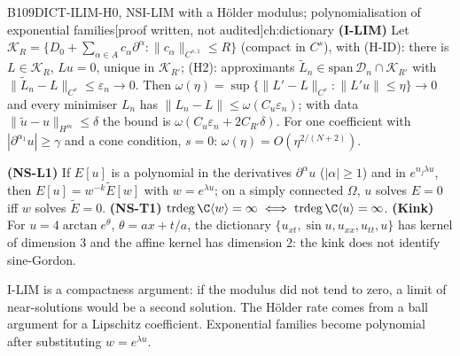 \documentclass[11pt,a4paper,oneside]{report}
\newcommand{\badge}[2]{\textcolor{#1}{\textsf{\footnotesize[#2]}}}
\newcommand{\pw}{\badge{cD}{proof written, not audited}}
\newenvironment{dimcard}[5]{\par\Needspace{12\baselineskip}\begin{dimcardbox}{#1}{#2}{#3}{#4}{#5}}{\end{dimcardbox}}
\begin{document}
\begin{dimcard}{B109}{DICT-ILIM-H0, NS}{I-LIM with a H\"older modulus; polynomialisation of exponential families}{\pw}{ch:dictionary}
\textbf{(I-LIM)} Let $\mathcal K_R=\{D_0+\sum_{\alpha\in A}c_\alpha\partial^\alpha:\|c_\alpha\|_{C^{s,1}}\le R\}$ (compact in $C^s$), with (H-ID): there is $L\in\mathcal K_R$, $Lu=0$, unique in $\mathcal K_{R'}$; (H2): approximants $\tilde L_n\in\mathrm{span}\,\mathcal D_n\cap\mathcal K_{R'}$ with $\|\tilde L_n-L\|_{C^s}\le\varepsilon_n\to0$. Then $\omega(\eta)=\sup\{\|L'-L\|_{C^s}:\|L'u\|\le\eta\}\to0$ and every minimiser $L_n$ has $\|L_n-L\|\le\omega(C_u\varepsilon_n)$; with data $\|\tilde u-u\|_{H^m}\le\delta$ the bound is $\omega(C_u\varepsilon_n+2C_{R'}\delta)$. For one coefficient with $|\partial^{\alpha_1}u|\ge\gamma$ and a cone condition, $s=0$: $\omega(\eta)=O(\eta^{2/(N+2)})$.

\textbf{(NS-L1)} If $E[u]$ is a polynomial in the derivatives $\partial^\alpha u$ ($|\alpha|\ge1$) and in $e^{n_j\lambda u}$, then $E[u]=w^{-k}\tilde E[w]$ with $w=e^{\lambda u}$; on a simply connected $\Omega$, $u$ solves $E=0$ iff $w$ solves $\tilde E=0$. \textbf{(NS-T1)} $\mathrm{trdeg}\,\C\langle w\rangle=\infty\iff\mathrm{trdeg}\,\C\langle u\rangle=\infty$. \textbf{(Kink)} For $u=4\arctan e^\theta$, $\theta=ax+t/a$, the dictionary $\{u_{xt},\sin u,u_{xx},u_{tt},u\}$ has kernel of dimension $3$ and the affine kernel has dimension $2$: the kink does not identify sine-Gordon.
\end{dimcard}

\begin{proofidea}
I-LIM is a compactness argument: if the modulus did not tend to zero, a limit of near-solutions would be a second solution. The Hölder rate comes from a ball argument for a Lipschitz coefficient. Exponential families become polynomial after substituting $w=e^{\lambda u}$.
\end{proofidea}
\end{document}
